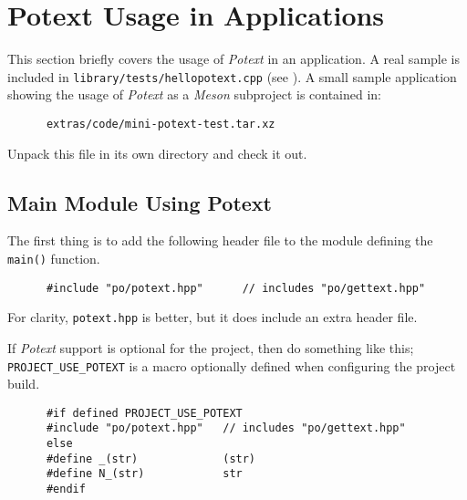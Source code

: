 %
%
%

\section{Potext Usage in Applications}
\label{subsec:potext_usage}

   This section briefly covers the usage of \textsl{Potext} in an
   application.
   A real sample is included in \texttt{library/tests/hellopotext.cpp}
   (see ).
   A small sample application showing the usage of
   \textsl{Potext} as a \textsl{Meson} subproject is
   contained in:

   \begin{verbatim}
      extras/code/mini-potext-test.tar.xz
   \end{verbatim}

   Unpack this file in its own directory and check it out.

\subsection{Main Module Using Potext}
\label{subsubsec:potext_usage_main}

   The first thing is to add the following header file
   to the module defining the \texttt{main()} function.

   \begin{verbatim}
      #include "po/potext.hpp"      // includes "po/gettext.hpp"
   \end{verbatim}

   For clarity, \texttt{potext.hpp} is better, but it does include
   an extra header file.

   If \textsl{Potext} support is optional for the project, then do
   something like this; \texttt{PROJECT\_USE\_POTEXT}
   is a macro optionally defined when configuring the project build.

   \begin{verbatim}
      #if defined PROJECT_USE_POTEXT
      #include "po/potext.hpp"   // includes "po/gettext.hpp"
      else
      #define _(str)             (str)
      #define N_(str)            str
      #endif
   \end{verbatim}

